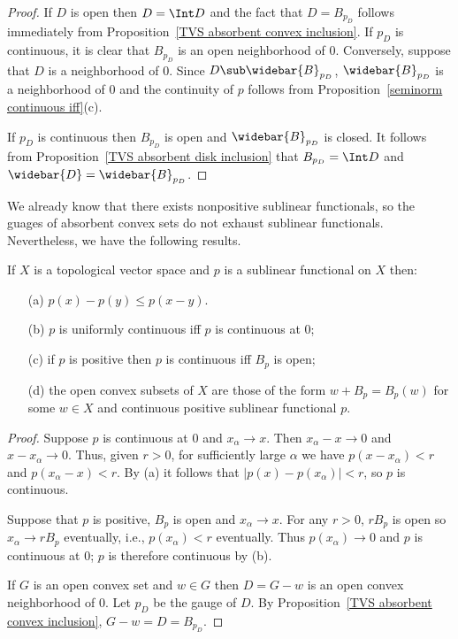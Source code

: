 \begin{proof}
If $D$ is open then $D=\Int D$ and the fact that $D=B_{p_D}$ follows immediately from Proposition~\ref{TVS absorbent convex inclusion}. If $p_D$ is continuous, it is clear that $B_{p_D}$ is an open neighborhood of $0$. Conversely, suppose that $D$ is a neighborhood of $0$. Since $D\sub\widebar{B}_{p_D}$, $\widebar{B}_{p_D}$ is a neighborhood of $0$ and the continuity of $p$ follows from Proposition~\ref{seminorm continuous iff}(c).\par
If $p_D$ is continuous then $B_{p_D}$ is open and $\widebar{B}_{p_D}$ is closed. It follows from Proposition~\ref{TVS absorbent disk inclusion} that $B_{p_D}=\Int D$ and $\widebar{D}=\widebar{B}_{p_D}$.
\end{proof}
We already know that there exists nonpositive sublinear functionals, so the guages of absorbent convex sets do not exhaust sublinear functionals. Nevertheless, we have the following results.
\begin{proposition}\label{TVS sublinear functional prop}
If $X$ is a topological vector space and $p$ is a sublinear functional on $X$ then:
\begin{itemize}
\item[(a)] $p(x)-p(y)\leq p(x-y)$.
\item[(b)] $p$ is uniformly continuous iff $p$ is continuous at $0$;
\item[(c)] if $p$ is positive then $p$ is continuous iff $B_p$ is open;
\item[(d)] the open convex subsets of $X$ are those of the form $w+B_p=B_p(w)$ for some $w\in X$ and continuous positive sublinear functional $p$. 
\end{itemize}
\end{proposition}
\begin{proof}
Suppose $p$ is continuous at $0$ and $x_\alpha\to x$. Then $x_\alpha-x\to 0$ and $x-x_\alpha\to 0$. Thus, given $r>0$, for sufficiently large $\alpha$ we have $p(x-x_\alpha)<r$ and $p(x_\alpha-x)<r$. By (a) it follows that $|p(x)-p(x_\alpha)|<r$, so $p$ is continuous.\par
Suppose that $p$ is positive, $B_p$ is open and $x_\alpha\to x$. For any $r>0$, $rB_p$ is open so $x_\alpha\to rB_p$ eventually, i.e., $p(x_\alpha)<r$ eventually. Thus $p(x_\alpha)\to 0$ and $p$ is continuous at $0$; $p$ is therefore continuous by (b).\par
If $G$ is an open convex set and $w\in G$ then $D=G-w$ is an open convex neighborhood of $0$. Let $p_D$ be the gauge of $D$. By Proposition~\ref{TVS absorbent convex inclusion}, $G-w=D=B_{p_D}$.
\end{proof}
